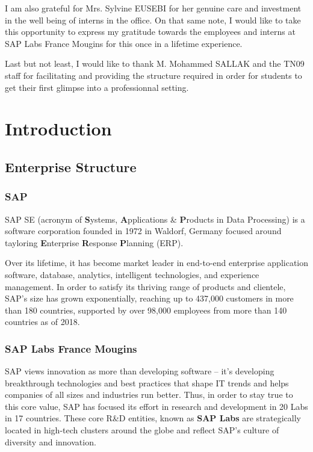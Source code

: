 \documentclass[11pt]{article}
\begin{document}
I am also grateful for Mrs. Sylvine EUSEBI for her genuine care and investment in the well being of interns in the office. On that same note, I would like to take this opportunity to express my gratitude towards the employees and interns at SAP Labs France Mougins for this once in a lifetime experience. 

Last but not least, I would like to thank M. Mohammed SALLAK and the TN09 staff for facilitating and providing the structure required in order for students to get their first glimpse into a professionnal setting.

\newpage
\section{Introduction}
\subsection{Enterprise Structure}
\subsubsection{SAP}
\hspace{5mm} SAP SE (acronym of \textbf{S}ystems, \textbf{A}pplications \& \textbf{P}roducts in Data Processing) is a software corporation founded in 1972 in Waldorf, Germany focused around tayloring \textbf{E}nterprise \textbf{R}esponse \textbf{P}lanning (ERP). 

\vspace{2mm}
\noindent Over its lifetime, it has become market leader in end-to-end enterprise application software, database, analytics, intelligent technologies, and experience management. In order to satisfy its thriving range of products and clientele, SAP's size has grown exponentially, reaching up to 437,000 customers in more than 180 countries, supported by over 98,000 employees from more than 140 countries as of 2018. 

\subsubsection{SAP Labs France Mougins}

\hspace{5mm} SAP views innovation as more than developing software – it's developing breakthrough technologies and best practices that shape IT trends and helps companies of all sizes and industries run better. Thus, in order to stay true to this core value, SAP has focused its effort in research and development in 20 Labs in 17 countries. These core R\&D entities, known as \textbf{SAP Labs} are strategically located in high-tech clusters around the globe and reflect SAP’s culture of diversity and innovation. 
\end{document}
